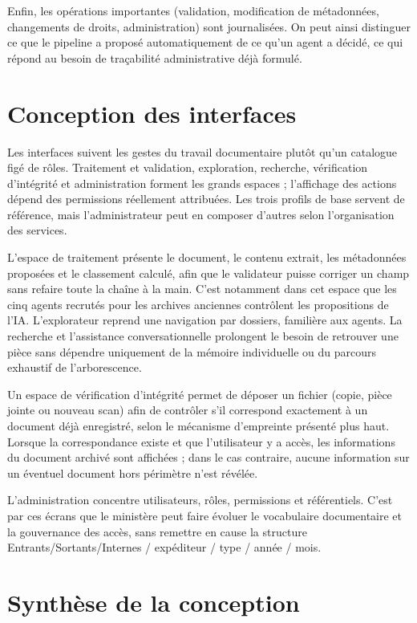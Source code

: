 Enfin, les opérations importantes (validation, modification de métadonnées, changements de droits, administration) sont journalisées. On peut ainsi distinguer ce que le pipeline a proposé automatiquement de ce qu'un agent a décidé, ce qui répond au besoin de traçabilité administrative déjà formulé.

\section{Conception des interfaces}

Les interfaces suivent les gestes du travail documentaire plutôt qu'un catalogue figé de rôles. Traitement et validation, exploration, recherche, vérification d'intégrité et administration forment les grands espaces ; l'affichage des actions dépend des permissions réellement attribuées. Les trois profils de base servent de référence, mais l'administrateur peut en composer d'autres selon l'organisation des services.

L'espace de traitement présente le document, le contenu extrait, les métadonnées proposées et le classement calculé, afin que le validateur puisse corriger un champ sans refaire toute la chaîne à la main. C'est notamment dans cet espace que les cinq agents recrutés pour les archives anciennes contrôlent les propositions de l'IA. L'explorateur reprend une navigation par dossiers, familière aux agents. La recherche et l'assistance conversationnelle prolongent le besoin de retrouver une pièce sans dépendre uniquement de la mémoire individuelle ou du parcours exhaustif de l'arborescence.

Un espace de vérification d'intégrité permet de déposer un fichier (copie, pièce jointe ou nouveau scan) afin de contrôler s'il correspond exactement à un document déjà enregistré, selon le mécanisme d'empreinte présenté plus haut. Lorsque la correspondance existe et que l'utilisateur y a accès, les informations du document archivé sont affichées ; dans le cas contraire, aucune information sur un éventuel document hors périmètre n'est révélée.

L'administration concentre utilisateurs, rôles, permissions et référentiels. C'est par ces écrans que le ministère peut faire évoluer le vocabulaire documentaire et la gouvernance des accès, sans remettre en cause la structure Entrants/Sortants/Internes / expéditeur / type / année / mois.

\section{Synthèse de la conception}

